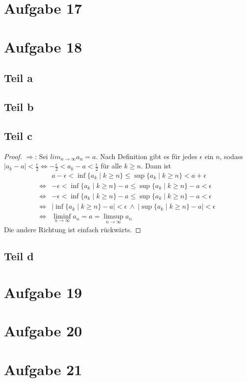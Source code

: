 \documentclass[10pt,a4paper]{article}
\begin{document}
\section{Aufgabe 17}

\section{Aufgabe 18}

\subsection{Teil a}

\subsection{Teil b}

\subsection{Teil c}
\begin{proof}
  $\Rightarrow$: Sei $lim_{n \rightarrow \infty} a_{n} = a$.
  Nach Definition gibt es für jedes $\epsilon$ ein $n$, sodass $|a_{k} - a| < \frac{\epsilon}{2} \Leftrightarrow -\frac{\epsilon}{2} < a_{k} - a < \frac{\epsilon}{2}$ für alle $k \ge n$.
  Dann ist
  \begin{align*}
    & a - \epsilon < \inf \{ a_{k} \mid k \ge n \} \le \sup \{ a_{k} \mid k \ge n \} < a + \epsilon\\
    \Leftrightarrow & -\epsilon < \inf \{ a_{k} \mid k \ge n \} - a \le \sup \{ a_{k} \mid k \ge n \} - a < \epsilon\\
    \Leftrightarrow & -\epsilon < \inf \{ a_{k} \mid k \ge n \} - a \le \sup \{ a_{k} \mid k \ge n \} - a < \epsilon\\
    \Leftrightarrow & |\inf \{ a_{k} \mid k \ge n \} - a| < \epsilon\ \land\ |\sup \{ a_{k} \mid k \ge n \} - a| < \epsilon\\
    \Leftrightarrow & \liminf_{n \rightarrow \infty} a_{n} = a = \limsup_{n \rightarrow \infty} a_{n}
  \end{align*}
  Die andere Richtung ist einfach rückwärts.
\end{proof}

\subsection{Teil d}

\section{Aufgabe 19}

\section{Aufgabe 20}

\section{Aufgabe 21}
\end{document}
